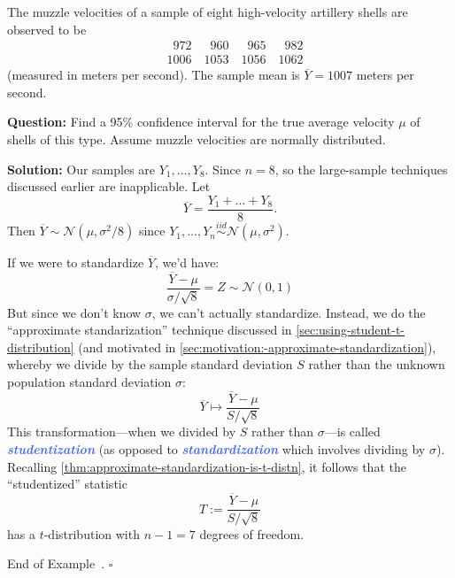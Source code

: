 \documentclass[10pt]{article}
\theoremstyle{definition}
\newtheorem{example}[theorem]{Example}
\renewenvironment{example}
{\begin{oldexample}}
  {\par\smallskip\hfill   End of Example~\theexample. $\square$    \par\end{oldexample}}
\newcommand{\vt}{\vskip 5mm} %
\newcommand{\Fl}{\vt\noindent\textbf} %
\newcommand{\1}[1]{\textbf{1}_{\left[#1\right]}} %
\newcommand{\demph}[1]{\textcolor{RoyalBlue}{\textbf{\slshape #1}}} %
\begin{document}
\begin{example}[Similar to example 8.11 in the textbook]
  The muzzle velocities of a sample of eight high-velocity artillery shells
  are observed to be
  \begin{align*}
    &\phantom{1}972 \quad \phantom{1}960 \quad \phantom{1}965 \quad  \phantom{1}982 \\
    &1006   \quad 1053 \quad 1056 \quad 1062
  \end{align*}
  (measured in meters per second). The sample mean is $\overline{Y}=1007$
  meters per second.

  \Fl{Question:} Find a 95\% confidence interval for the true average velocity $\mu$ of
  shells of this type. Assume muzzle velocities are normally distributed.

  \Fl{Solution:} Our samples are $Y_{1},\ldots,Y_{8}$. Since $n=8$, so the
  large-sample techniques discussed earlier are inapplicable. Let
  \begin{equation*}
    \overline{Y} = \frac{Y_{1}+\ldots+Y_{8}}{8}.
  \end{equation*}
  Then $\overline{Y}\sim \mathcal{N}(\mu,\sigma^{2}/8)$ since
  $Y_{1},\ldots,Y_{n}\overset{iid}{\sim} \mathcal{N}(\mu,\sigma^{2})$.

  If we were to standardize $\overline{Y}$, we'd have:
  \begin{equation*}
    \frac{\overline{Y}-\mu}{\sigma/\sqrt{8}}=Z\sim \mathcal{N}(0,1)
  \end{equation*}
  But since we don't know $\sigma$, we can't actually standardize. Instead, we
  do the ``approximate standarization'' technique discussed in
  \cref{sec:using-student-t-distribution} (and motivated in
  \cref{sec:motivation:-approximate-standardization}), whereby we divide by
  the sample standard deviation $S$ rather than the unknown population
  standard deviation $\sigma$:
  \begin{equation*}
    \overline{Y} \mapsto \frac{\overline{Y}-\mu}{S/\sqrt{8}}
  \end{equation*}
  This transformation---when we divided by $S$ rather than $\sigma$---is
  called \demph{studentization} (as opposed to \demph{standardization} which
  involves dividing by $\sigma$). Recalling
  \cref{thm:approximate-standardization-is-t-distn}, it follows that the
  ``studentized'' statistic
  \begin{equation}\label{eq:18}
    T:=\frac{\overline{Y}-\mu}{S/\sqrt{8}}
  \end{equation}
  has a $t$-distribution with $n-1=7$ degrees of freedom.


\end{example}
\end{document}
